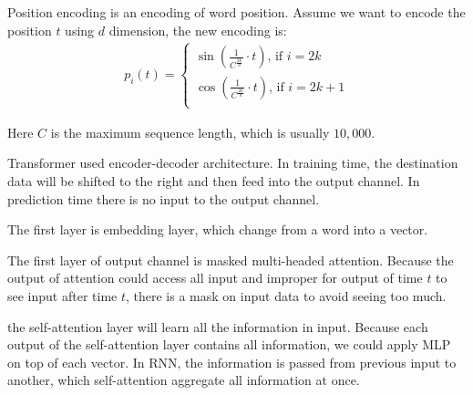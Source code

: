 \begin{definition}
    Position encoding is an encoding of word position. Assume we want to encode the position $t$ using $d$ dimension, the new encoding is:
    \begin{equation}
        \begin{aligned}
            p_i (t) = \begin{cases}
            \displaystyle \sin\left(\frac{1}{C^{\frac{2k}{d}}} \cdot t \right)  \textrm{, if }  i = 2k \\
            \displaystyle \cos\left(\frac{1}{C^{\frac{2k}{d}}} \cdot t \right)  \textrm{, if }  i = 2k +1 \\
            \end{cases}
        \end{aligned}        
    \end{equation}
    
    Here $C$ is the maximum sequence length, which is usually $10,000$.
\end{definition}


Transformer used encoder-decoder architecture. In training time, the destination data will be shifted to the right and then feed into the output channel. In prediction time there is no input to the output channel.

The first layer is embedding layer, which change from a word into a vector.

The first layer of output channel is masked multi-headed attention. Because the output of attention could access all input and improper for output of time $t$ to see input after time $t$, there is a mask on input data to avoid seeing too much.

the self-attention layer will learn all the information in input. Because each output of the self-attention layer contains all information, we could apply MLP on top of each vector. In RNN, the information is passed from previous input to another, which self-attention aggregate all information at once.

